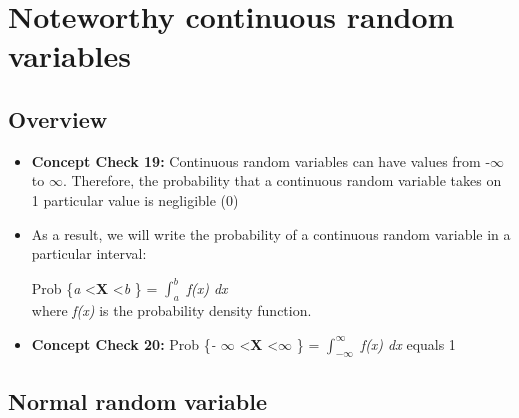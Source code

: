 \documentclass[12pt]{report}
\begin{document}
\bigskip

\bigskip

\bigskip
\section{Noteworthy continuous random variables}

\subsection{Overview}

\begin{itemize}

\item \textbf{Concept Check 19:}  Continuous random variables can have values from -$\infty$ to $\infty$. Therefore, the probability that a continuous random variable takes on 1 particular value is \color{red} negligible (0) \color{black}

\item As a result, we will write the probability of a continuous random variable in a particular interval:

\bigskip
Prob \{\textit{a} \textless \textbf{X} \textless \textit{b} \} = $\int_{a}^{b}$ \textit{f\big(x\big) dx} \\

where \textit{f\big(x\big)} is the probability density function. 

\item \textbf{Concept Check 20:} Prob \{\textit{- $\infty$} \textless \textbf{X} \textless \textit{$\infty$} \} = $\int_{- \infty}^{\infty}$ \textit{f\big(x\big) dx} equals \color{red} 1 

\color{black}

\end{itemize}

\subsection{Normal random variable}
\end{document}
